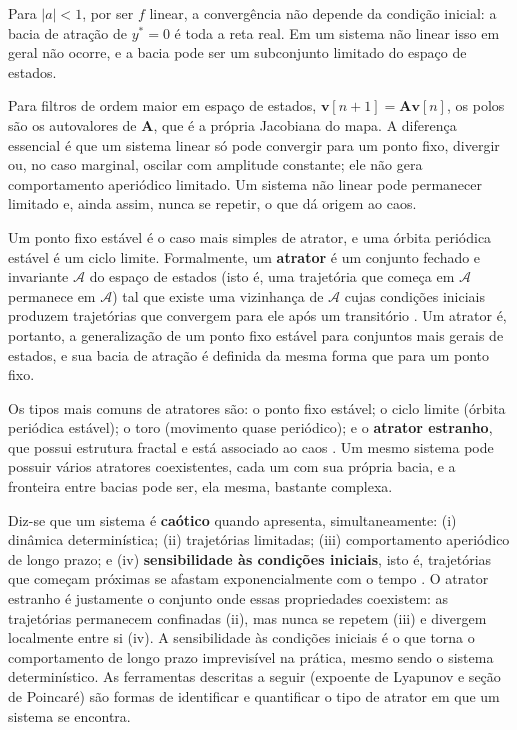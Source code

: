 \documentclass[]{article}
\begin{document}
	Para $|a| < 1$, por ser $f$ linear, a convergência não depende da condição inicial: a bacia de atração de $y^* = 0$ é toda a reta real. Em um sistema não linear isso em geral não ocorre, e a bacia pode ser um subconjunto limitado do espaço de estados.
	
	Para filtros de ordem maior em espaço de estados, $\mathbf{v}[n+1] = \mathbf{A}\mathbf{v}[n]$, os polos são os autovalores de $\mathbf{A}$, que é a própria Jacobiana do mapa. A diferença essencial é que um sistema linear só pode convergir para um ponto fixo, divergir ou, no caso marginal, oscilar com amplitude constante; ele não gera comportamento aperiódico limitado. Um sistema não linear pode permanecer limitado e, ainda assim, nunca se repetir, o que dá origem ao caos.
	
	Um ponto fixo estável é o caso mais simples de atrator, e uma órbita periódica estável é um ciclo limite. Formalmente, um \textbf{atrator} é um conjunto fechado e invariante $\mathcal{A}$ do espaço de estados (isto é, uma trajetória que começa em $\mathcal{A}$ permanece em $\mathcal{A}$) tal que existe uma vizinhança de $\mathcal{A}$ cujas condições iniciais produzem trajetórias que convergem para ele após um transitório \cite{strogatz2015nonlinear, alligood1996chaos}. Um atrator é, portanto, a generalização de um ponto fixo estável para conjuntos mais gerais de estados, e sua bacia de atração é definida da mesma forma que para um ponto fixo.
	
	Os tipos mais comuns de atratores são: o ponto fixo estável; o ciclo limite (órbita periódica estável); o toro (movimento quase periódico); e o \textbf{atrator estranho}, que possui estrutura fractal e está associado ao caos \cite{strogatz2015nonlinear}. Um mesmo sistema pode possuir vários atratores coexistentes, cada um com sua própria bacia, e a fronteira entre bacias pode ser, ela mesma, bastante complexa.
	
	Diz-se que um sistema é \textbf{caótico} quando apresenta, simultaneamente: (i) dinâmica determinística; (ii) trajetórias limitadas; (iii) comportamento aperiódico de longo prazo; e (iv) \textbf{sensibilidade às condições iniciais}, isto é, trajetórias que começam próximas se afastam exponencialmente com o tempo \cite{strogatz2015nonlinear}. O atrator estranho é justamente o conjunto onde essas propriedades coexistem: as trajetórias permanecem confinadas (ii), mas nunca se repetem (iii) e divergem localmente entre si (iv). A sensibilidade às condições iniciais é o que torna o comportamento de longo prazo imprevisível na prática, mesmo sendo o sistema determinístico. As ferramentas descritas a seguir (expoente de Lyapunov e seção de Poincaré) são formas de identificar e quantificar o tipo de atrator em que um sistema se encontra.
\end{document}
